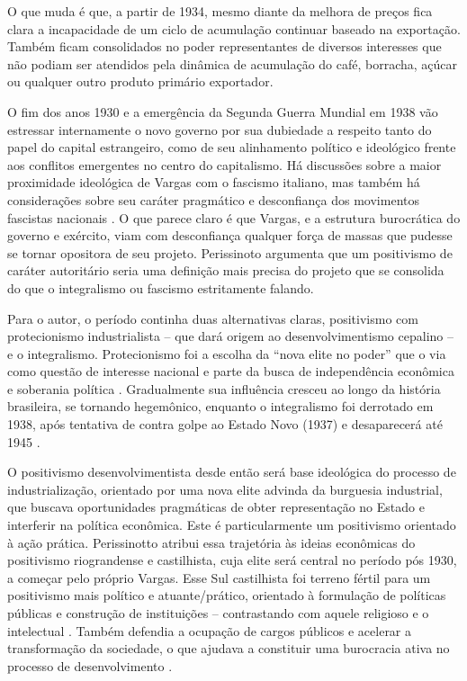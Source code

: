O que muda é que, a partir de 1934, mesmo diante da melhora de preços
fica clara a incapacidade de um ciclo de acumulação continuar baseado na
exportação. Também ficam consolidados no poder representantes de
diversos interesses que não podiam ser atendidos pela dinâmica de
acumulação do café, borracha, açúcar ou qualquer outro produto primário
exportador.

\begin{esboco}
\end{esboco}

O fim dos anos 1930 e a emergência da Segunda Guerra Mundial em 1938 vão
estressar internamente o novo governo por sua dubiedade a respeito tanto do
papel do capital estrangeiro, como de seu alinhamento político e
ideológico frente aos conflitos emergentes no centro do capitalismo. Há
discussões sobre a maior proximidade ideológica de Vargas com o fascismo
italiano, mas também há considerações sobre seu caráter pragmático e
desconfiança dos movimentos fascistas nacionais \citep[]{schwarcz_brasil_2015}. O que parece
claro é que Vargas, e a estrutura burocrática do governo e exército,
viam com desconfiança qualquer força de massas que pudesse se tornar
opositora de seu projeto. Perissinoto \citeyearpar[]{perissinotto_ideias_2023} argumenta que um
positivismo de caráter autoritário seria uma definição mais precisa do projeto
que se consolida do que o integralismo ou fascismo estritamente falando.

Para o autor, o período continha duas alternativas claras, positivismo
com protecionismo industrialista -- que dará origem ao
desenvolvimentismo cepalino -- e o integralismo. Protecionismo foi a
escolha da ``nova elite no poder'' que o via como questão de interesse
nacional e parte da busca de independência econômica e soberania
política \citep{perissinotto_ideias_2023}. Gradualmente sua influência cresceu ao longo da
história brasileira, se tornando hegemônico, enquanto o integralismo foi
derrotado em 1938, após tentativa de contra golpe ao Estado Novo (1937)
e desaparecerá até 1945 \citep{perissinotto_ideias_2023}.

O positivismo desenvolvimentista desde então será base ideológica do
processo de industrialização, orientado por uma nova elite advinda da
burguesia industrial, que buscava oportunidades pragmáticas de
obter representação no Estado e interferir na política econômica. 
Este é particularmente um positivismo orientado à ação
prática. Perissinotto \citeyearpar[]{perissinotto_ideias_2023}
atribui essa trajetória às ideias econômicas do positivismo riograndense
e castilhista, cuja elite será central no período pós 1930,
a começar pelo próprio Vargas. Esse Sul
castilhista foi terreno fértil para um positivismo mais político e
atuante/prático, orientado à formulação de políticas públicas e
construção de instituições -- contrastando com aquele religioso e o
intelectual \citeyearpar[]{perissinotto_ideias_2023}.
Também defendia a ocupação de cargos públicos e acelerar a
transformação da sociedade, o que ajudava a constituir uma burocracia
ativa no processo de desenvolvimento \citep[]{bresser-pereira_burocracia_2007}.

